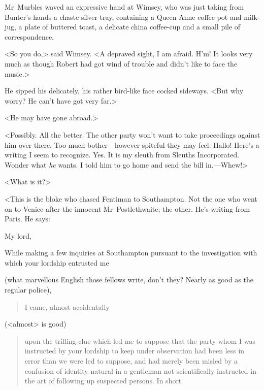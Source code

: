 Mr~Murbles waved an expressive hand at Wimsey, who was just taking from Bunter's hands a chaste silver tray, containing a Queen Anne coffee-pot and milk-jug, a plate of buttered toast, a delicate china coffee-cup and a small pile of correspondence.

<So you do,> said Wimsey. <A depraved sight, I am afraid. H'm! It looks very much as though Robert had got wind of trouble and didn't like to face the music.>

He sipped his  delicately, his rather bird-like face cocked sideways. <But why worry? He can't have got very far.>

<He may have gone abroad.>

<Possibly. All the better. The other party won't want to take proceedings against him over there. Too much bother—however spiteful they may feel. Hallo! Here's a writing I seem to recognize. Yes. It is my sleuth from Sleuths Incorporated. Wonder what \emph{he} wants. I told him to go home and send the bill in.—Whew!>

<What is it?>

<This is the bloke who chased Fentiman to Southampton. Not the one who went on to Venice after the innocent Mr~Postlethwaite; the other. He's writing from Paris. He says:

\begin{mail}{}{My lord,}

While making a few inquiries at Southampton pursuant to the investigation with which your lordship entrusted me 
\end{mail} %

(what marvellous English those fellows write, don't they? Nearly as good as the regular police), 

\begin{quotation}I came, almost accidentally\end{quotation} 

(<almost> is good) 

\begin{quotation}
	upon the trifling clue which led me to suppose that the party whom I was instructed by your lordship to keep under observation had been less in error than we were led to suppose, and had merely been misled by a confusion of identity natural in a gentleman not scientifically instructed in the art of following up suspected persons. In short
\end{quotation} 

